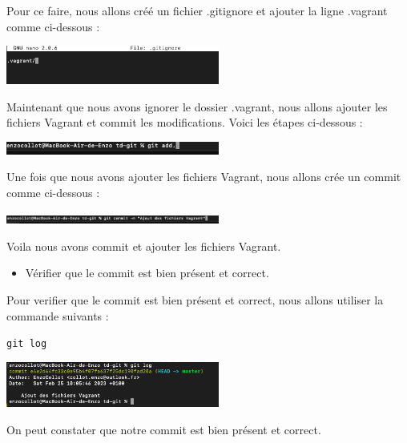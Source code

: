\documentclass[12pt]{article}
\begin{document}
Pour ce faire, nous allons créé un fichier .gitignore et ajouter la ligne .vagrant comme ci-dessous : 

\vspace{0.3cm}

\begin{center}
  \includegraphics[width=7cm]{Image-TD-Git-1/gitignore.png}
\end{center}

\vspace{0.3cm}

Maintenant que nous avons ignorer le dossier .vagrant, nous allons ajouter les fichiers Vagrant et commit les modifications. Voici les étapes ci-dessous : 

\vspace{0.3cm}

\begin{center}
  \includegraphics[width=7cm]{Image-TD-Git-1/git add.png}
\end{center}

Une fois que nous avons ajouter les fichiers Vagrant, nous allons crée un commit comme ci-dessous : 

\vspace{0.3cm}

\begin{center}
  \includegraphics[width=7cm]{Image-TD-Git-1/git commit.png}
\end{center}

\vspace{0.3cm}

Voila nous avons commit et ajouter les fichiers Vagrant.

\vspace{0.3cm}

\begin{itemize}
  \item Vérifier que le commit est bien présent et correct.
\end{itemize}

\vspace{0.3cm}

Pour verifier que le commit est bien présent et correct, nous allons utiliser la commande suivants : 

\texttt{git log}

\vspace{0.3cm}

\begin{center}
  \includegraphics[width=7cm]{Image-TD-Git-1/git-log.png}
\end{center}

\vspace{0.3cm}

On peut constater que notre commit est bien présent et correct.
\end{document}
